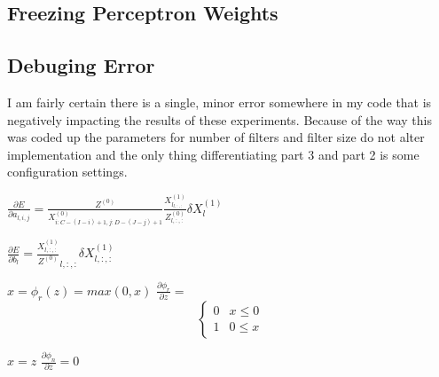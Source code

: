 \documentclass{article}
\begin{document}
\subsection{Freezing Perceptron Weights}




\subsection{Debuging Error}
I am fairly certain there is a single, minor error somewhere in my code that is negatively impacting the results of these experiments.  Because of the way this was coded up the parameters for number of filters and filter size do not alter implementation and the only thing differentiating part 3 and part 2 is some configuration settings.  

$\frac{\partial E}{\partial a_{l,i,j}}=
\frac{Z^{(0)}}{X_{i:C-(I-i)+1, j:D-(J-j)+1}^{(0)}}
\frac{X^{(1)}_{l_{l,:,:}}}{Z_{l,:,:}^{(0)}}
\delta X^{(1)}_{l}$

$\frac{\partial E}{\partial b_{l}}=
\frac{X^{(1)}_{l,:,:}}{Z^{(0)}}_{l,:,:}
\delta X^{(1)}_{l,:,:}$

$x = \phi_r(z)= max(0,x)$
$\frac{\partial \phi_r}{\partial z}= $\[ \begin{cases} 
0 & x\leq 0 \\
1 & 0\leq x 
\end{cases}
\]

$x = z$  $\frac{\partial \phi_n}{\partial z }=0$
\end{document}
